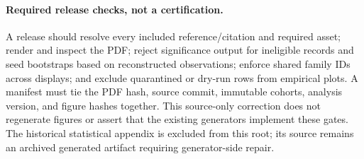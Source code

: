 \paragraph{Required release checks, not a certification.}
A release should resolve every included reference/citation and required asset;
render and inspect the PDF; reject significance output for ineligible records
and seed bootstraps based on reconstructed observations; enforce shared family
IDs across displays; and exclude quarantined or dry-run rows from empirical
plots. A manifest must tie the PDF hash, source commit, immutable cohorts,
analysis version, and figure hashes together. This source-only correction does
not regenerate figures or assert that the existing generators implement these
gates. The historical statistical appendix is excluded from this root; its
source remains an archived generated artifact requiring generator-side repair.
